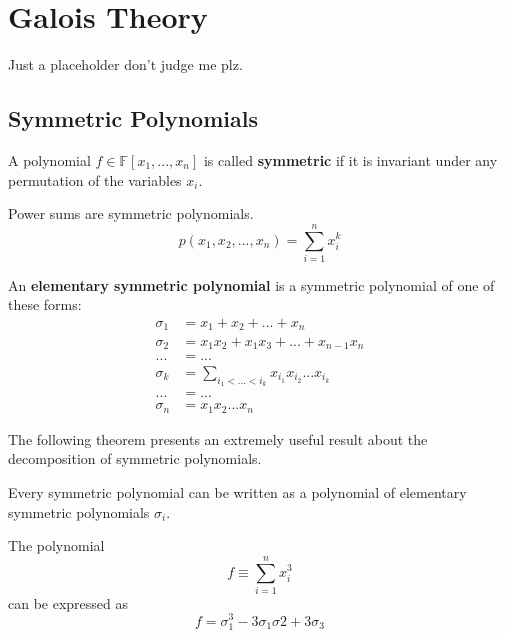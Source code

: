 \section{Galois Theory}

Just a placeholder don't judge me plz. 

\subsection{Symmetric Polynomials}

  \begin{definition}
    A polynomial $f \in \mathbb{F}[x_1, ..., x_n]$ is called \textbf{symmetric} if it is invariant under any permutation of the variables $x_i$. 
  \end{definition}

  \begin{example}
    Power sums are symmetric polynomials. 
    \begin{equation}
      p(x_1, x_2, ..., x_n) = \sum_{i=1}^n x_i^k
    \end{equation}
  \end{example}

  \begin{definition}
    An \textbf{elementary symmetric polynomial} is a symmetric polynomial of one of these forms: 
    \begin{align*}
      \sigma_1 & = x_1 + x_2 + ... + x_n \\
      \sigma_2 & = x_1 x_2 + x_1 x_3 + ... + x_{n-1} x_n \\
      ... & = ... \\
      \sigma_k & = \sum_{i_1 < ... < i_k} x_{i_1} x_{i_2} ... x_{i_k} \\
      ... & = ... \\
      \sigma_n & = x_1 x_2 ... x_n
    \end{align*}
  \end{definition}

  The following theorem presents an extremely useful result about the decomposition of symmetric polynomials. 

  \begin{theorem}
    Every symmetric polynomial can be written as a polynomial of elementary symmetric polynomials $\sigma_i$. 
  \end{theorem}

  \begin{example}
    The polynomial 
    \begin{equation}
      f \equiv \sum_{i=1}^n x_i^3
    \end{equation}
    can be expressed as 
    \begin{equation}
      f = \sigma_1^3 - 3 \sigma_1 \sigma 2 + 3 \sigma_3
    \end{equation}
  \end{example}

